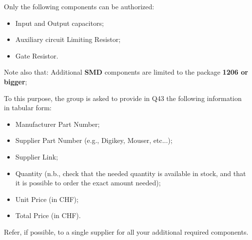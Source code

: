 \documentclass{PELsmallreport}
\begin{document}


Only the following components can be authorized:
\begin{itemize}
    \item Input and Output capacitors;
    \item Auxiliary circuit Limiting Resistor;
    \item Gate Resistor. \\
\end{itemize}

Note also that: Additional \textbf{SMD} components are limited to the package \textbf{1206 or bigger};

To this purpose, the group is asked to provide in Q43 the following information in tabular form:
\begin{itemize}
    \item Manufacturer Part Number;
    \item Supplier Part Number (e.g., Digikey, Mouser, etc...);
    \item Supplier Link;
    \item Quantity (n.b., check that the needed quantity is available in stock, and that it is possible to order the exact amount needed);
    \item Unit Price (in CHF);
    \item Total Price (in CHF).
\end{itemize}
Refer, if possible, to a single supplier for all your additional required components.
\end{document}

